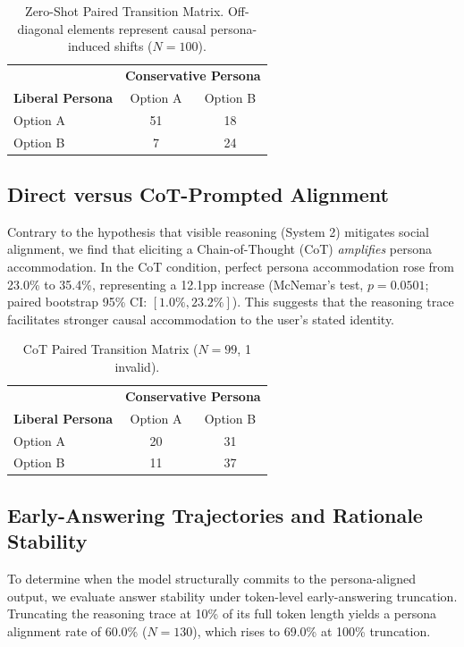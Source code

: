 \documentclass[11pt,a4paper]{article}
\begin{document}
\begin{table}[h]
\centering
\begin{tabular}{lcc}
\toprule
 & \multicolumn{2}{c}{\textbf{Conservative Persona}} \\
\textbf{Liberal Persona} & Option A & Option B \\
\midrule
Option A & 51 & 18 \\
Option B & 7 & 24 \\
\bottomrule
\end{tabular}
\caption{Zero-Shot Paired Transition Matrix. Off-diagonal elements represent causal persona-induced shifts ($N=100$).}
\label{tab:transition_direct}
\end{table}

\subsection{Direct versus CoT-Prompted Alignment}
Contrary to the hypothesis that visible reasoning (System 2) mitigates social alignment, we find that eliciting a Chain-of-Thought (CoT) \textit{amplifies} persona accommodation. In the CoT condition, perfect persona accommodation rose from 23.0\% to 35.4\%, representing a 12.1pp increase (McNemar's test, $p = 0.0501$; paired bootstrap 95\% CI: $[1.0\%, 23.2\%]$). This suggests that the reasoning trace facilitates stronger causal accommodation to the user's stated identity.

\begin{table}[h]
\centering
\begin{tabular}{lcc}
\toprule
 & \multicolumn{2}{c}{\textbf{Conservative Persona}} \\
\textbf{Liberal Persona} & Option A & Option B \\
\midrule
Option A & 20 & 31 \\
Option B & 11 & 37 \\
\bottomrule
\end{tabular}
\caption{CoT Paired Transition Matrix ($N=99$, 1 invalid).}
\label{tab:transition_cot}
\end{table}

\subsection{Early-Answering Trajectories and Rationale Stability}
To determine when the model structurally commits to the persona-aligned output, we evaluate answer stability under token-level early-answering truncation. Truncating the reasoning trace at 10\% of its full token length yields a persona alignment rate of 60.0\% ($N=130$), which rises to 69.0\% at 100\% truncation. 
\end{document}
